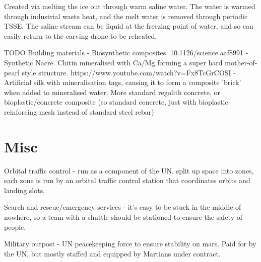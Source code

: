 \documentclass[10pt]{article}
\begin{document}
Created via melting the ice out through warm saline water. The water is warmed through industrial waste heat, and the melt water is removed through periodic TSSE. The saline stream can be liquid at the freezing point of water, and so can easily return to the carving drone to be reheated.


TODO Building materials - Biosynthetic composites. 
10.1126/science.aaf8991 - Synthetic Nacre. Chitin mineralised with Ca/Mg forming a super hard mother-of-pearl style structure.
https://www.youtube.com/watch?v=Fx8TcGrCOSI - Artificial silk with mineralisation tags, causing it to form a composite 'brick' when added to mineralised water.
More standard regolith concrete, or bioplastic/concrete composite (so standard concrete, just with bioplastic reinforcing mesh instead of standard steel rebar)

\section{Misc}
Orbital traffic control - run as a component of the UN. split up space into zones, each zone is run by an orbital traffic control station that coordinates orbits and landing slots.

Search and rescue/emergency services - it's easy to be stuck in the middle of nowhere, so a team with a shuttle should be stationed to ensure the safety of people.

Military outpost - UN peacekeeping force to ensure stability on mars. Paid for by the UN, but mostly staffed and equipped by Martians under contract.





\end{document}
